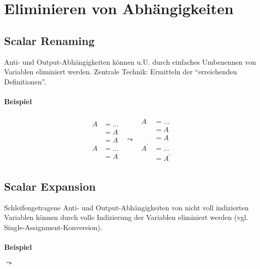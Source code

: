 \section{Eliminieren von Abhängigkeiten}

\subsection{Scalar Renaming}
Anti- und Output-Abhängigkeiten können u.U. durch einfaches Umbenennen
von Variablen eliminiert werden. Zentrale Technik: Ermitteln der
``erreichenden Definitionen''.

\paragraph{Beispiel}
\[
\begin{array}{ccc}
\begin{aligned}
A &= ... \\
   &= A \\
   &= A \\
A &= ... \\
   &= A
\end{aligned}
&
\leadsto
&
\begin{aligned}
A &= ... \\
   &= A \\
   &= A \\
A^\prime &= ... \\
   &= A^\prime
\end{aligned}
\end{array}
\]


\subsection{Scalar Expansion}
Schleifengetragene Anti- und Output-Abhängigkeiten von nicht voll
indizierten Variablen können durch volle Indizierung der Variablen
eliminiert werden (vgl. Single-Assignment-Konversion).


\paragraph{Beispiel}
\begin{minipage}{.4\textwidth}
\begin{algorithm}[H]
\SetAlgoLined
{}
\end{algorithm}
\end{minipage}
\begin{minipage}{.5\textwidth}
\qquad $\leadsto$ \qquad
\begin{algorithm}[H]
\SetAlgoLined
{}
\end{algorithm}
\end{minipage}


